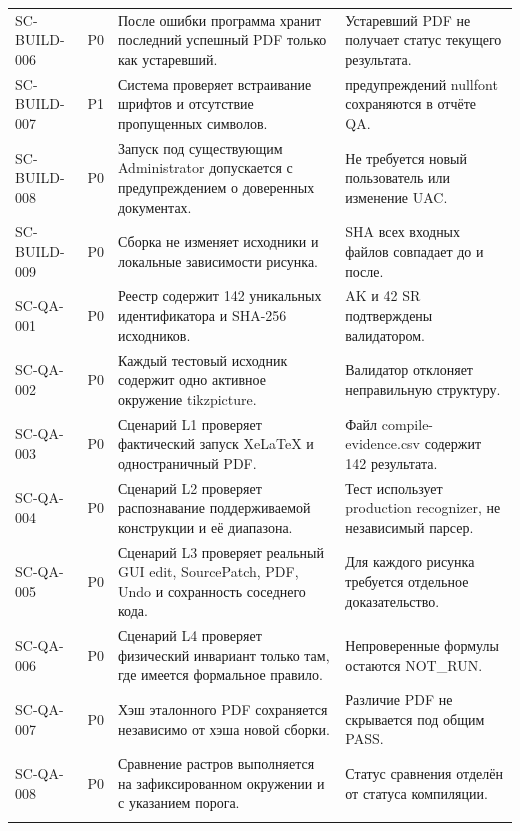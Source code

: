 \documentclass[11pt,a4paper,oneside]{scrreprt}
\begin{document}
\begin{longtable}{@{}>{\raggedright\arraybackslash}p{2.35cm}>{\raggedright\arraybackslash}p{0.75cm}>{\raggedright\arraybackslash}p{6.35cm}>{\raggedright\arraybackslash}p{5.2cm}@{}}
\footnotesize SC-BUILD-006 & P0 & После ошибки программа хранит последний успешный PDF только как устаревший. & Устаревший PDF не получает статус текущего результата. \\ \addlinespace[2pt]
\footnotesize SC-BUILD-007 & P1 & Система проверяет встраивание шрифтов и отсутствие пропущенных символов. & 120 предупреждений nullfont сохраняются в отчёте QA. \\ \addlinespace[2pt]
\footnotesize SC-BUILD-008 & P0 & Запуск под существующим Administrator допускается с предупреждением о доверенных документах. & Не требуется новый пользователь или изменение UAC. \\ \addlinespace[2pt]
\footnotesize SC-BUILD-009 & P0 & Сборка не изменяет исходники и локальные зависимости рисунка. & SHA всех входных файлов совпадает до и после. \\ \addlinespace[2pt]
\footnotesize SC-QA-001 & P0 & Реестр содержит 142 уникальных идентификатора и SHA-256 исходников. & 100 AK и 42 SR подтверждены валидатором. \\ \addlinespace[2pt]
\footnotesize SC-QA-002 & P0 & Каждый тестовый исходник содержит одно активное окружение tikzpicture. & Валидатор отклоняет неправильную структуру. \\ \addlinespace[2pt]
\footnotesize SC-QA-003 & P0 & Сценарий L1 проверяет фактический запуск XeLaTeX и одностраничный PDF. & Файл compile-evidence.csv содержит 142 результата. \\ \addlinespace[2pt]
\footnotesize SC-QA-004 & P0 & Сценарий L2 проверяет распознавание поддерживаемой конструкции и её диапазона. & Тест использует production recognizer, не независимый парсер. \\ \addlinespace[2pt]
\footnotesize SC-QA-005 & P0 & Сценарий L3 проверяет реальный GUI edit, SourcePatch, PDF, Undo и сохранность соседнего кода. & Для каждого рисунка требуется отдельное доказательство. \\ \addlinespace[2pt]
\footnotesize SC-QA-006 & P0 & Сценарий L4 проверяет физический инвариант только там, где имеется формальное правило. & Непроверенные формулы остаются NOT\_RUN. \\ \addlinespace[2pt]
\footnotesize SC-QA-007 & P0 & Хэш эталонного PDF сохраняется независимо от хэша новой сборки. & Различие PDF не скрывается под общим PASS. \\ \addlinespace[2pt]
\footnotesize SC-QA-008 & P0 & Сравнение растров выполняется на зафиксированном окружении и с указанием порога. & Статус сравнения отделён от статуса компиляции. \\ \addlinespace[2pt]

\end{longtable}
\end{document}
